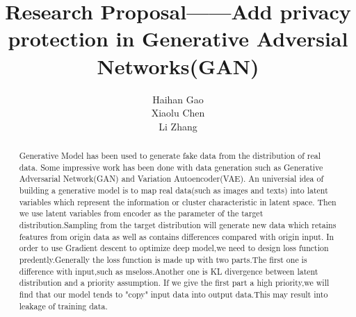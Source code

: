 \documentclass[
    ngerman,american
    ]{scrartcl}
\title{
        Research Proposal——Add privacy protection in Generative Adversial Networks(GAN)
        \\  \Large{\paperSubTitle{\lang}}} %
\author{
        Haihan Gao\\
        Xiaolu Chen\\
        Li Zhang
        }
\newcommand{\lang}{en}
\begin{document}
    
      \maketitle
        \begin{abstract}

            \ifthenelse{\equal{en}{\lang}}{}{}
            Generative Model has been used to generate fake data from the distribution of real data.
            Some impressive work has been done with data generation such as Generative Adversarial Network(GAN) and Variation Autoencoder(VAE).
            An universial idea of building a generative model is to map real data(such as images and texts) into latent variables which represent the information or cluster characteristic in latent space.
            Then we use latent variables from encoder as the parameter of the target distribution.Sampling from the target distribution will generate new data which retains features from origin data as well as contains differences compared with origin input. 
            In order to use Gradient descent to optimize deep model,we need to design loss function predently.Generally the loss function is made up with two parts.The first one is difference with input,such as mseloss.Another one is KL divergence between latent distribution and a priority assumption.
            If we give the first part a high priority,we will find that our model tends to "copy" input data into output data.This may result into leakage of training data.

        \end{abstract}
        
\end{document}

